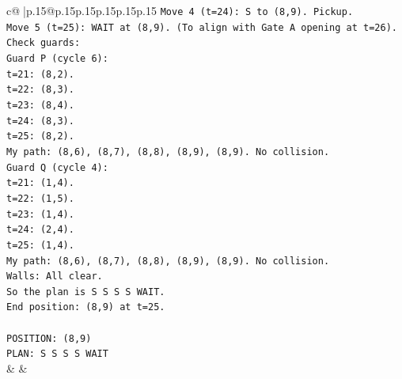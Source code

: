 \documentclass{article}
\begin{document}
{\begin{supertabular}{c@{$\;$}|p{.15\linewidth}@{}p{.15\linewidth}p{.15\linewidth}p{.15\linewidth}p{.15\linewidth}p{.15\linewidth}}
{{{\texttt{Move 4 (t=24): S to (8,9). Pickup.} \\
\texttt{Move 5 (t=25): WAIT at (8,9). (To align with Gate A opening at t=26).} \\
\texttt{Check guards:} \\
\texttt{Guard P (cycle 6):} \\
\texttt{t=21: (8,2).} \\
\texttt{t=22: (8,3).} \\
\texttt{t=23: (8,4).} \\
\texttt{t=24: (8,3).} \\
\texttt{t=25: (8,2).} \\
\texttt{My path: (8,6), (8,7), (8,8), (8,9), (8,9). No collision.} \\
\texttt{Guard Q (cycle 4):} \\
\texttt{t=21: (1,4).} \\
\texttt{t=22: (1,5).} \\
\texttt{t=23: (1,4).} \\
\texttt{t=24: (2,4).} \\
\texttt{t=25: (1,4).} \\
\texttt{My path: (8,6), (8,7), (8,8), (8,9), (8,9). No collision.} \\
\texttt{Walls: All clear.} \\
\texttt{So the plan is S S S S WAIT.} \\
\texttt{End position: (8,9) at t=25.} \\
\\ 
\texttt{POSITION: (8,9)} \\
\texttt{PLAN: S S S S WAIT} \\
            }
        }
    }
    & & \\ \\


\end{supertabular}}
\end{document}
